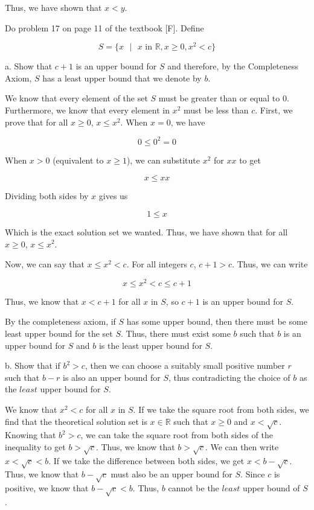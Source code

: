 \documentclass[addpoints]{exam}
\begin{document}
\begin{questions}
Thus, we have shown that $x < y$.

\question Do problem 17 on page 11 of the textbook [F]. Define 

\[S = \{x \text{  }| \text{ } x \text{ in } \mathbb{R}, x \geq 0, x^2 < c \}\]

a. Show that $c + 1$ is an upper bound for $S$ and therefore, by the Completeness Axiom, $S$ has a least upper bound
that we denote by $b$.

We know that every element of the set $S$ must be greater than or equal to $0$. Furthermore, we know that every 
element in $x^2$ must be less than $c$. First, we prove that for all $x \geq 0$, $x \leq x^2$. When $x = 0$, we have 

\[0 \leq 0^2 = 0\]

When $x > 0$ (equivalent to $x \geq 1$), we can substitute $x^2$ for $xx$ to get

\[x \leq xx\]

Dividing both sides by $x$ gives us

\[1 \leq x\]

Which is the exact solution set we wanted. Thus, we have shown that for all $x \geq 0$, $x \leq x^2$.

Now, we can say that $x \leq x^2 < c$. For all integers $c$, $c + 1 > c$. Thus, we can write 

\[x \leq x^2 < c \leq c + 1\]

Thus, we know that $x < c + 1$ for all $x$ in $S$, so $c + 1$ is an upper bound for $S$.

By the completeness axiom, if $S$ has some upper bound, then there must be some least upper bound for the set 
$S$. Thus, there must exist some $b$ such that $b$ is an upper bound for $S$ and $b$ is the least upper bound for $S$.

b. Show that if $b^2 > c$, then we can choose a suitably small positive number $r$ such that $b - r$ is also an upper
bound for $S$, thus contradicting the choice of $b$ as the $least$ upper bound for $S$.

We know that $x^2 < c$ for all $x$ in $S$. If we take the square root from both sides, we find that the theoretical 
solution set is $x \in \mathbb{R}$ such that $x \geq 0$ and $x < \sqrt{c}$. Knowing that $b^2 > c$, we can take the 
square root from both sides of the inequality to get $b > \sqrt{c}$. Thus, we know that $b > \sqrt{c}$. We can then write
$x < \sqrt{c} < b$. If we take the difference between both sides, we get $x < b - \sqrt{c}$. Thus, we know that $b - \sqrt{c}$ 
must also be an upper bound for $S$. Since $c$ is positive, we know that $b - \sqrt{c} < b$. Thus, $b$ cannot be the $least$ upper
bound of $S$. 


\end{questions}
\end{document}
